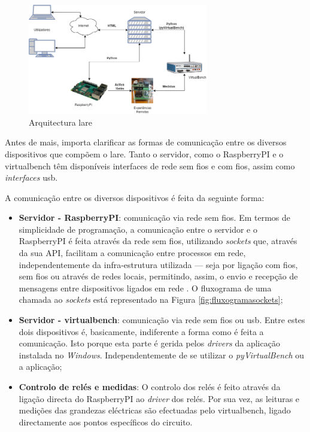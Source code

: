 \begin{figure}[hbtp]
    \centering
    \includegraphics[width=0.7\textwidth]{figures/arquitectura_ver2.drawio.png}
    \caption{Arquitectura \acrshort{lare}}
    \label{fig:representaçãogerallare}
\end{figure}

Antes de mais, importa clarificar as formas de comunicação entre os diversos dispositivos que compõem o \acrshort{lare}. Tanto o servidor, como o \gls{RaspberryPI} e o \acrshort{virtualbench} têm disponíveis interfaces de rede sem fios e com fios, assim como \textit{interfaces} \acrshort{usb}.

A comunicação entre os diversos dispositivos é feita da seguinte forma:
\begin{itemize}
    \item \textbf{Servidor - \gls{RaspberryPI}}: comunicação via rede sem fios. Em termos de simplicidade de programação, a comunicação entre o servidor e o \gls{RaspberryPI} é feita através da rede sem fios, utilizando \textit{sockets} que, através da sua API, facilitam a comunicação entre processos em rede, independentemente da infra-estrutura utilizada — seja por ligação com fios, sem fios ou através de redes locais, permitindo, assim, o envio e recepção de mensagens entre dispositivos ligados em rede \cite{Sockets}. O fluxograma de uma chamada ao \textit{sockets} está representado na Figura \ref{fig:fluxogramasockets};
    \item \textbf{Servidor - \acrshort{virtualbench}}: comunicação via rede sem fios ou \acrshort{usb}. Entre estes dois dispositivos é, basicamente, indiferente a forma como é feita a comunicação. Isto porque esta parte é gerida pelos \textit{drivers} da aplicação instalada no \textit{Windows}. Independentemente de se utilizar o \textit{pyVirtualBench} ou a aplicação;
    \item \textbf{Controlo de relés e medidas}: O controlo dos relés é feito através da ligação directa do \gls{RaspberryPI} ao \textit{driver} dos relés. Por sua vez, as leituras e medições das grandezas eléctricas são efectuadas pelo \acrshort{virtualbench}, ligado directamente aos pontos específicos do circuito.
\end{itemize}

